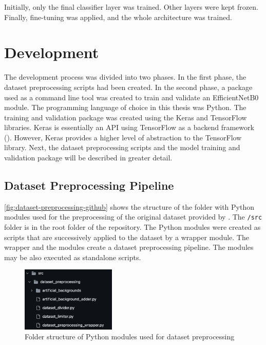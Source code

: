 \documentclass{BachelorBUI}
\begin{document}
    Initially, only the final classifier layer was trained. Other layers were kept frozen. Finally, fine-tuning was applied, and the whole architecture was trained.

\section{Development}
    The development process was divided into two phases. In the first phase, the dataset preprocessing scripts had been created. In the second phase, a package used as a command line tool was created to train and validate an EfficientNetB0 module. The programming language of choice in this thesis was Python. The training and validation package was created using the Keras and TensorFlow libraries. Keras is essentially an API using TensorFlow as a backend framework (\cite{tensorflow:2024, keras:2024}). However, Keras provides a higher level of abstraction to the TensorFlow library. Next, the dataset preprocessing scripts and the model training and validation package will be described in greater detail.
    \subsection{Dataset Preprocessing Pipeline}

        \autoref{fig:dataset-preprocessing-github} shows the structure of the folder with Python modules used for the preprocessing of the original dataset provided by \textcite{Mohanty:2016}. The \verb|/src| folder is in the root folder of the repository. The Python modules were created as scripts that are successively applied to the dataset by a wrapper module. The wrapper and the modules create a dataset preprocessing pipeline. The modules may be also executed as standalone scripts.

        \begin{figure}[h]
            \centering
            \includegraphics[width=0.4\textwidth]{dataset_preprocessing_github.png}
            \caption{\centering Folder structure of Python modules used for dataset preprocessing}
            \label{fig:dataset-preprocessing-github}
        \end{figure}
\end{document}
